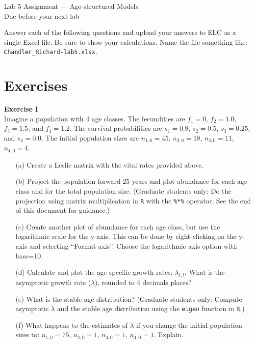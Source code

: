 \documentclass[12pt]{article}\usepackage[]{graphicx}\usepackage[]{color}
\begin{document}
{
  \Large
  \centering
  Lab 5 Assignment --- Age-structured Models \\
  Due before your next lab \par
}

\vspace{12pt}

Answer each of the following questions and upload your answers to ELC
as a single Excel file. Be sure to show your calculations. Name the
file something like: \texttt{Chandler\_Richard-lab5.xlsx}. \\

\section*{Exercises}


{\bf Exercise I \\}
Imagine a population with 4 age classes. The fecundities are $f_1=0$,
$f_2=1.0$, $f_3=1.5$, and $f_4=1.2$. The survival probabilities are
$s_1=0.8$, $s_2=0.5$, $s_3=0.25$, and $s_4=0.0$. The initial
population sizes are $n_{1,0}=45$, $n_{2,0}=18$, $n_{3,0}=11$, $n_{4,0}=4$.
\begin{itemize}
  \item[(a)] Create a Leslie matrix with the vital rates provided above.
  \item[(b)] Project the population forward 25 years and plot abundance for
    each age class and for the total population size. (Graduate students
    only: Do the projection using matrix multiplication in {\tt R} with
    the \texttt{\%*\%} operator. See the end of this document for
    guidance.)
  \item[(c)] Create another plot of abundance for each age class, but use the
    logarithmic scale for the y-axis. This can be done by right-clicking
    on the y-axis and selecting ``Format axis''. Choose the logarithmic
    axis option with base=10.
  \item[(d)] Calculate and plot the age-specific
    growth rates: $\lambda_{i,t}$. What is the asymptotic growth rate
    ($\lambda$), rounded to 4 decimals places?
  \item[(e)] What is the stable age distribution? (Graduate students only:
    Compute asymptotic $\lambda$ and the stable age distribution using
    the \texttt{eigen} function in {\tt R}.)
  \item[(f)] What happens to the estimates of $\lambda$ if you change the
    initial population sizes to: $n_{1,0}=75$, $n_{2,0}=1$, $n_{3,0}=1$,
    $n_{4,0}=1$. Explain.
\end{itemize}
\end{document}
